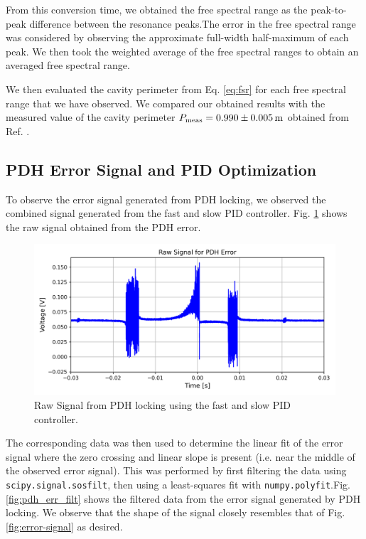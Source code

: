\documentclass[a4paper]{report}
\numberwithin{equation}{section}
\begin{document}
From this conversion time, we obtained the free spectral range as the peak-to-peak difference between
the resonance peaks.The error in the free spectral range was considered by observing the approximate 
full-width half-maximum of each peak. We then took the weighted average of the free spectral ranges to obtain an averaged
free spectral range. \par 

We then evaluated the cavity perimeter from Eq. \ref{eq:fsr} for each free spectral range that we have observed.
We compared our obtained results with the measured value of the cavity perimeter
 $P_{\text{meas}} = \SI{0.990\pm 0.005}{\meter}$ obtained from Ref. \cite{Groh2021}. 


\subsection{PDH Error Signal and PID Optimization}

To observe the error signal generated from PDH locking, we observed the combined signal generated from the fast and slow PID controller. 
Fig. \ref{fig:errsig_raw} shows the raw signal obtained from the PDH error. \par 

\begin{figure}[h!]
	\centering
	\includegraphics[width=0.8\columnwidth]{raw_err_sig.png}
	\caption{Raw Signal from PDH locking using the fast and slow PID controller.}
	\label{fig:errsig_raw}
\end{figure}

The corresponding data was then used to determine the linear fit of the error signal where the zero crossing and 
linear slope is present (i.e. near the middle of the observed error signal). 
This was performed by first filtering the data using \texttt{scipy.signal.sosfilt}, then using a least-squares fit with 
\texttt{numpy.polyfit}.Fig. \ref{fig:pdh_err_filt} shows the filtered data from the error signal generated by PDH locking. We observe that the shape of the signal closely
resembles that of Fig. \ref{fig:error-signal} as desired. 
\end{document}

